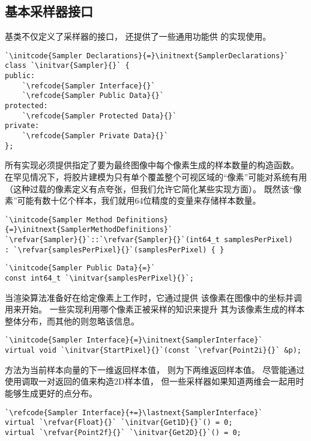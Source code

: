 \subsection{基本采样器接口}\label{sub:基本采样器接口}
基类不仅定义了采样器的接口，
还提供了一些通用功能供
的实现使用。
\begin{lstlisting}
`\initcode{Sampler Declarations}{=}\initnext{SamplerDeclarations}`
class `\initvar{Sampler}{}` {
public:
    `\refcode{Sampler Interface}{}`
    `\refcode{Sampler Public Data}{}`
protected:
    `\refcode{Sampler Protected Data}{}`
private:
    `\refcode{Sampler Private Data}{}`
};
\end{lstlisting}

所有实现必须提供指定了要为最终图像中每个像素生成的样本数量的构造函数。
在罕见情况下，将胶片建模为只有单个覆盖整个可视区域的“像素”可能对系统有用
（这种过载的像素定义有点夸张，但我们允许它简化某些实现方面）。
既然该“像素”可能有数十亿个样本，我们就用64位精度的变量来存储样本数量。
\begin{lstlisting}
`\initcode{Sampler Method Definitions}{=}\initnext{SamplerMethodDefinitions}`
`\refvar{Sampler}{}`::`\refvar{Sampler}{}`(int64_t samplesPerPixel)
: `\refvar{samplesPerPixel}{}`(samplesPerPixel) { }
\end{lstlisting}
\begin{lstlisting}
`\initcode{Sampler Public Data}{=}`
const int64_t `\initvar{samplesPerPixel}{}`;
\end{lstlisting}

当渲染算法准备好在给定像素上工作时，它通过提供
该像素在图像中的坐标并调用来开始。
一些实现利用哪个像素正被采样的知识来提升
其为该像素生成的样本整体分布，而其他的则忽略该信息。
\begin{lstlisting}
`\initcode{Sampler Interface}{=}\initnext{SamplerInterface}`
virtual void `\initvar{StartPixel}{}`(const `\refvar{Point2i}{}` &p);
\end{lstlisting}

方法为当前样本向量的下一维返回样本值，
则为下两维返回样本值。
尽管能通过使用调取一对返回的值来构造2D样本值，
但一些采样器如果知道两维会一起用时能够生成更好的点分布。
\begin{lstlisting}
`\refcode{Sampler Interface}{+=}\lastnext{SamplerInterface}`
virtual `\refvar{Float}{}` `\initvar{Get1D}{}`() = 0;
virtual `\refvar{Point2f}{}` `\initvar{Get2D}{}`() = 0;
\end{lstlisting}


